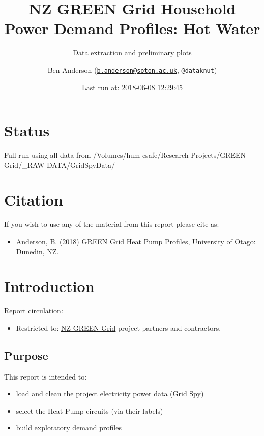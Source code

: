\documentclass[]{article}
\title{NZ GREEN Grid Household Power Demand Profiles: Hot Water}
\subtitle{Data extraction and preliminary plots}
\author{Ben Anderson
(\href{mailto:b.anderson@soton.ac.uk}{\nolinkurl{b.anderson@soton.ac.uk}},
\texttt{@dataknut})}
\date{Last run at: 2018-06-08 12:29:45}
\providecommand{\tightlist}{%
  \setlength{\itemsep}{0pt}\setlength{\parskip}{0pt}}
\begin{document}
\maketitle

{
\setcounter{tocdepth}{2}
\tableofcontents
}
\newpage

\section{Status}\label{status}

Full run using all data from /Volumes/hum-csafe/Research Projects/GREEN
Grid/\_RAW DATA/GridSpyData/

\section{Citation}\label{citation}

If you wish to use any of the material from this report please cite as:

\begin{itemize}
\tightlist
\item
  Anderson, B. (2018) GREEN Grid Heat Pump Profiles, University of
  Otago: Dunedin, NZ.
\end{itemize}

\newpage

\section{Introduction}\label{introduction}

Report circulation:

\begin{itemize}
\tightlist
\item
  Restricted to:
  \href{https://www.otago.ac.nz/centre-sustainability/research/energy/otago050285.html}{NZ
  GREEN Grid} project partners and contractors.
\end{itemize}

\subsection{Purpose}\label{purpose}

This report is intended to:

\begin{itemize}
\tightlist
\item
  load and clean the project electricity power data (Grid Spy)
\item
  select the Heat Pump circuits (via their labels)
\item
  build exploratory demand profiles
\end{itemize}
\end{document}
